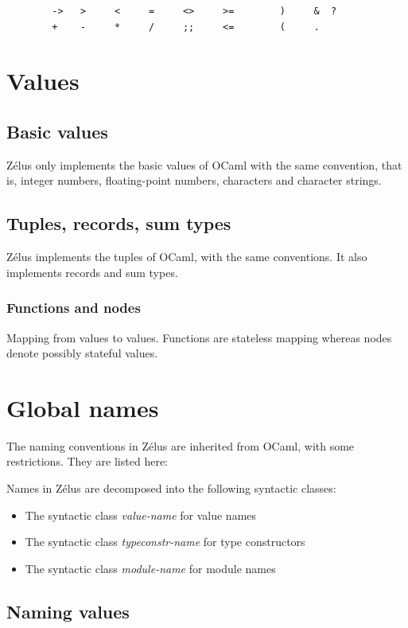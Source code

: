 \documentclass[11pt,titlepage,twoside]{report}
\newcommand{\zelus}{{\sf Z\'elus}}
\newcommand{\ocaml}{{\sf OCaml}}
\newcommand{\nterm}[1]{{\em #1}}
\begin{document}
\begin{verbatim}
        ->   >     <     =     <>     >=        )     &  ?
        +    -     *     /     ;;     <=        (     .
\end{verbatim}

\section{Values}

\subsection{Basic values}
\zelus{} only implements the basic values of \ocaml{} with the same
convention, that is, integer numbers, floating-point numbers,
characters and character strings.
\subsection{Tuples, records, sum types}
\zelus{} implements the tuples of \ocaml, with the same conventions. It
also implements records and sum types.

\subsubsection{Functions and nodes}
Mapping from values to values. Functions are stateless mapping whereas
nodes denote possibly stateful values.

\section{Global names}
\label{global-names}
The naming conventions in \zelus{} are inherited from \ocaml, with some
restrictions. They are listed here:

Names in \zelus{} are decomposed into the following syntactic classes:
\begin{itemize}
\item
  The syntactic class \nterm{value-name} for value names
\item
  The syntactic class \nterm{typeconstr-name} for type constructors
\item
  The syntactic class \nterm{module-name} for module names
\end{itemize}

\subsection{Naming values}
\end{document}
